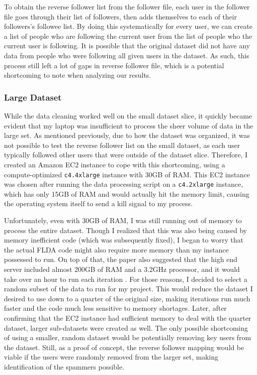 \documentclass[a4paper]{article}
\begin{document}
To obtain the reverse follower list from the follower file, each user in the follower file goes through their list of followers, then adds themselves to each of their followers's followee list. By doing this systematically for every user, we can create a list of people who are following the current user from the list of people who the current user is following. It is possible that the original dataset did not have any data from people who were following all given users in the dataset. As such, this process still left a lot of gaps in reverse follower file, which is a potential shortcoming to note when analyzing our results.

\subsubsection{Large Dataset}
While the data cleaning worked well on the small dataset slice, it quickly became evident that my laptop was insufficient to process the sheer volume of data in the large set. As mentioned previously, due to how the dataset was organized, it was not possible to test the reverse follower list on the small dataset, as each user typically followed other users that were outside of the dataset slice. Therefore, I created an Amazon EC2 instance to cope with this shortcoming, using a compute-optimized \verb+c4.4xlarge+ instance with 30GB of RAM. This EC2 instance was chosen after running the data processing script on a \verb+c4.2xlarge+ instance, which has only 15GB of RAM and would actually hit the memory limit, causing the operating system itself to send a kill signal to my process.

Unfortunately, even with 30GB of RAM, I was still running out of memory to process the entire dataset. Though I realized that this was also being caused by memory inefficient code (which was subsequently fixed), I began to worry that the actual FLDA code might also require more memory than my instance possessed to run. On top of that, the paper also suggested that the high end server included almost 200GB of RAM and a 3.2GHz processor, and it would take over an hour to run each iteration \cite{flda}. For those reasons, I decided to select a random subset of the data to run for my project. This would reduce the dataset I desired to use down to a quarter of the original size, making iterations run much faster and the code much less sensitive to memory shortages. Later, after confirming that the EC2 instance had sufficient memory to deal with the quarter dataset, larger sub-datasets were created as well. The only possible shortcoming of using a smaller, random dataset would be potentially removing key users from the dataset. Still, as a proof of concept, the reverse follower mapping would be viable if the users were randomly removed from the larger set, making identification of the spammers possible.
\end{document}
